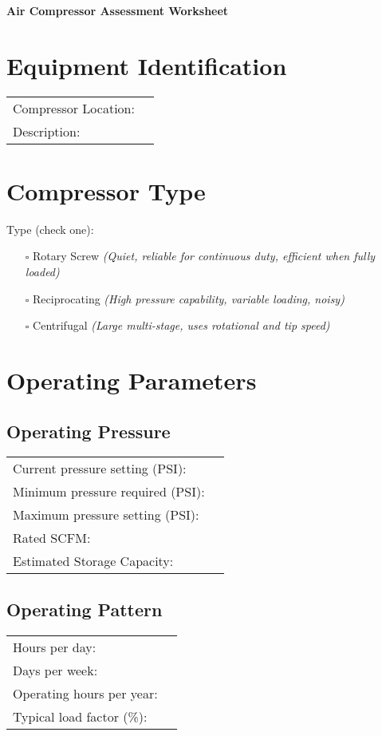 \documentclass[./main.tex]{subfiles}
\begin{document}
\begin{center}
\Large\textbf{Air Compressor Assessment Worksheet}
\end{center}

\section*{Equipment Identification}
\noindent\begin{tabularx}{\textwidth}{@{}lX@{}}
Compressor Location: & \hrulefill \\[2ex]
Description: & \hrulefill \\[2ex]
\end{tabularx}

\section*{Compressor Type}
\noindent Type (check one):
\begin{itemize}[leftmargin=1cm]
\item[$\square$] Rotary Screw \hfill \textit{(Quiet, reliable for continuous duty, efficient when fully loaded)}
\item[$\square$] Reciprocating \hfill \textit{(High pressure capability, variable loading, noisy)}
\item[$\square$] Centrifugal \hfill \textit{(Large multi-stage, uses rotational and tip speed)}
\end{itemize}

\section*{Operating Parameters}
\subsection*{Operating Pressure}
\noindent\begin{tabularx}{\textwidth}{@{}lX@{}}
Current pressure setting (PSI): & \hrulefill \\[2ex]
Minimum pressure required (PSI): & \hrulefill \\[2ex]
Maximum pressure setting (PSI): & \hrulefill \\[2ex]
Rated SCFM: & \hrulefill \\[2ex]
Estimated Storage Capacity: & \hrulefill \\[2ex]
\end{tabularx}

\subsection*{Operating Pattern}
\noindent\begin{tabularx}{\textwidth}{@{}lX@{}}
Hours per day: & \hrulefill \\[2ex]
Days per week: & \hrulefill \\[2ex]
Operating hours per year: & \hrulefill \\[2ex]
Typical load factor (\%): & \hrulefill \\[2ex]
\end{tabularx}
\end{document}
